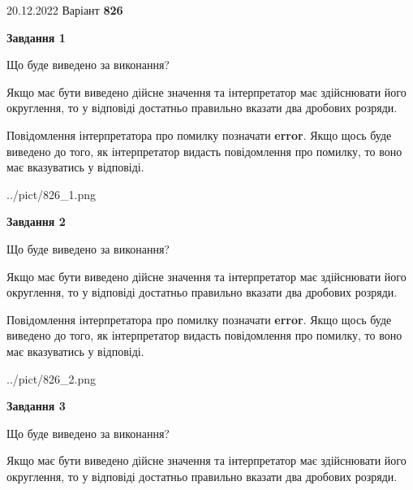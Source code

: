 \documentclass[12pt, ukrainian]{article}
\begin{document}
{20.12.2022 Варіант \No \textbf { 826 }\par}
{
\begin {Large}

{\begin {center}\textbf{Завдання 1}\end {center}}\par
Що буде виведено за виконання? \par

Якщо має бути виведено дійсне значення та інтерпретатор має здійснювати його округлення, 
то у відповіді достатньо правильно вказати два дробових розряди.

Повідомлення інтерпретатора про помилку позначати \textbf{error}.
Якщо щось буде виведено до того, як інтерпретатор видасть повідомлення про помилку, 
то воно має вказуватись у відповіді. \par

\begin{center}
	{../pict/826_1.png}
\end{center}
\newpage

{\begin {center}\textbf{Завдання 2}\end {center}}\par
Що буде виведено за виконання? \par

Якщо має бути виведено дійсне значення та інтерпретатор має здійснювати його округлення, 
то у відповіді достатньо правильно вказати два дробових розряди.

Повідомлення інтерпретатора про помилку позначати \textbf{error}.
Якщо щось буде виведено до того, як інтерпретатор видасть повідомлення про помилку, 
то воно має вказуватись у відповіді. \par

\begin{center}
	{../pict/826_2.png}
\end{center}
\newpage

{\begin {center}\textbf{Завдання 3}\end {center}}\par
Що буде виведено за виконання? \par

Якщо має бути виведено дійсне значення та інтерпретатор має здійснювати його округлення, 
то у відповіді достатньо правильно вказати два дробових розряди.


\end{Large}}
\end{document}

